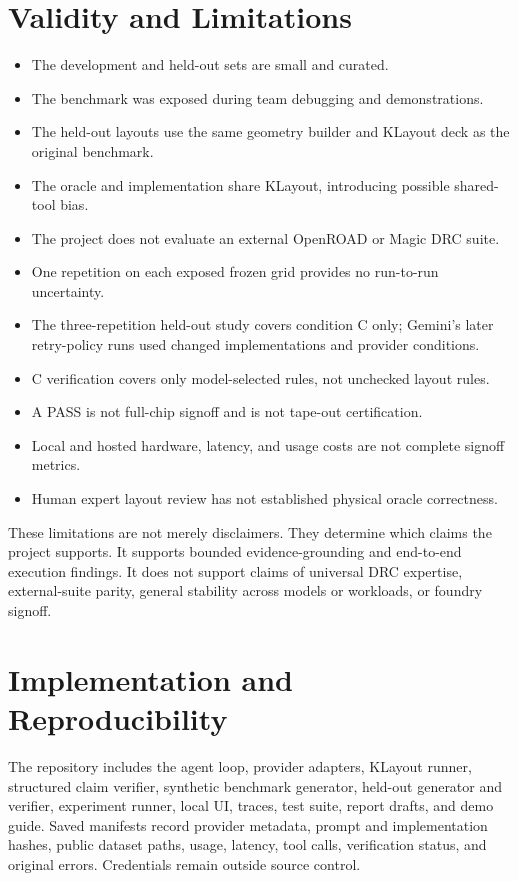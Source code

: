 \documentclass[10pt,twocolumn]{article}
\begin{document}
\section{Validity and Limitations}
\begin{itemize}[leftmargin=*,itemsep=2pt]
\item The development and held-out sets are small and curated.
\item The benchmark was exposed during team debugging and demonstrations.
\item The held-out layouts use the same geometry builder and KLayout deck as the
      original benchmark.
\item The oracle and implementation share KLayout, introducing possible shared-tool bias.
\item The project does not evaluate an external OpenROAD or Magic DRC suite.
\item One repetition on each exposed frozen grid provides no run-to-run uncertainty.
\item The three-repetition held-out study covers condition C only; Gemini's later
      retry-policy runs used changed implementations and provider conditions.
\item C verification covers only model-selected rules, not unchecked layout rules.
\item A PASS is not full-chip signoff and is not tape-out certification.
\item Local and hosted hardware, latency, and usage costs are not complete signoff metrics.
\item Human expert layout review has not established physical oracle correctness.
\end{itemize}

These limitations are not merely disclaimers. They determine which claims the project
supports. It supports bounded evidence-grounding and end-to-end execution findings.
It does not support claims of universal DRC expertise, external-suite parity,
general stability across models or workloads, or foundry signoff.

\section{Implementation and Reproducibility}
The repository includes the agent loop, provider adapters, KLayout runner, structured
claim verifier, synthetic benchmark generator, held-out generator and verifier,
experiment runner, local UI, traces, test suite, report drafts, and demo guide.
Saved manifests record provider metadata, prompt and implementation hashes, public
dataset paths, usage, latency, tool calls, verification status, and original errors.
Credentials remain outside source control.
\end{document}
